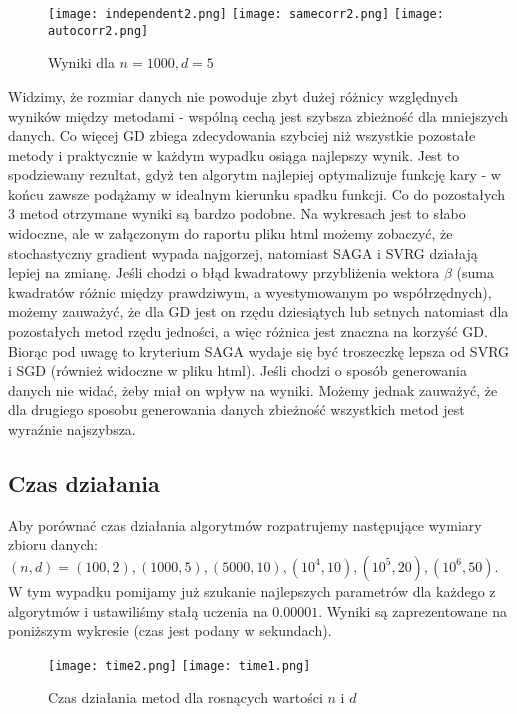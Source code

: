 \documentclass[a4paper]{article}
\begin{document}
\begin{figure}[H]
\caption{Wyniki dla $n=1000, d=5$}
  \texttt{[image: independent2.png]}
\endminipage \hfill 
{}
  \texttt{[image: samecorr2.png]}
\endminipage \hfill 
{}
  \texttt{[image: autocorr2.png]}
\endminipage \hfill 
\end{figure}

Widzimy, że rozmiar danych nie powoduje zbyt dużej różnicy względnych wyników między metodami - wspólną cechą jest szybsza zbieżność dla mniejszych danych. Co więcej GD zbiega zdecydowania szybciej niż wszystkie pozostałe metody i praktycznie w każdym wypadku osiąga najlepszy wynik. Jest to spodziewany rezultat, gdyż ten algorytm najlepiej optymalizuje funkcję kary - w końcu zawsze podążamy w idealnym kierunku spadku funkcji. Co do pozostałych 3 metod otrzymane wyniki są bardzo podobne. Na wykresach jest to słabo widoczne, ale w załączonym do raportu pliku html możemy zobaczyć, że stochastyczny gradient wypada najgorzej, natomiast SAGA i SVRG działają lepiej na zmianę. Jeśli chodzi o błąd kwadratowy przybliżenia wektora $\beta$ (suma kwadratów różnic między prawdziwym, a wyestymowanym po współrzędnych), możemy zauważyć, że dla GD jest on rzędu dziesiątych lub setnych natomiast dla pozostałych metod rzędu jedności, a więc różnica jest znaczna na korzyść GD. Biorąc pod uwagę to kryterium SAGA wydaje się być troszeczkę lepsza od SVRG i SGD (również widoczne w pliku html). Jeśli chodzi o sposób generowania danych nie widać, żeby miał on wpływ na wyniki. Możemy jednak zauważyć, że dla drugiego sposobu generowania danych zbieżność wszystkich metod jest wyraźnie najszybsza.

\subsection{Czas działania}
Aby porównać czas działania algorytmów rozpatrujemy następujące wymiary zbioru danych: $(n,d) = (100,2), (1000,5), (5000, 10), (10^4, 10), (10^5, 20), (10^6, 50)$. W tym wypadku pomijamy już szukanie najlepszych parametrów dla każdego z algorytmów i ustawiliśmy stałą uczenia na $0.00001$. Wyniki są zaprezentowane na poniższym wykresie (czas jest podany w sekundach).

\begin{figure}[H]
\caption{Czas działania metod dla rosnących wartości $n$ i $d$}
  \texttt{[image: time2.png]}
\endminipage \hfill 
{}
  \texttt{[image: time1.png]}
\endminipage \hfill 
\end{figure}
\end{document}
